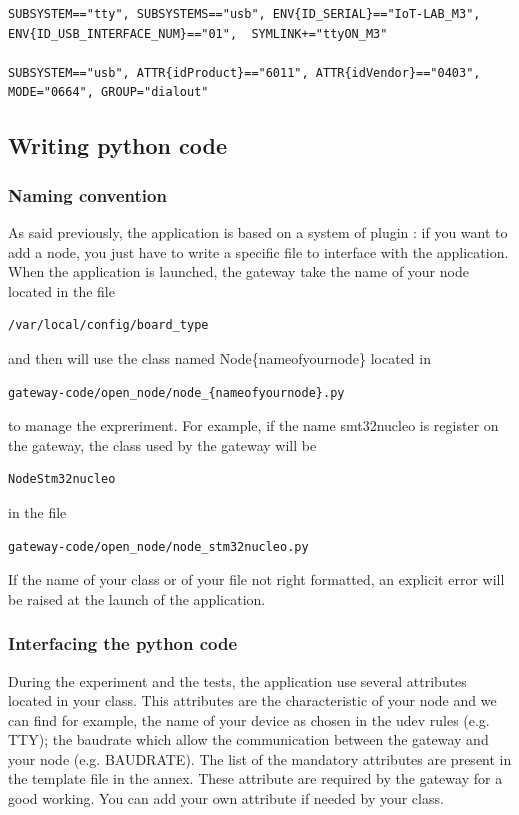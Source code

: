 \documentclass[12pt,a4paper,twoside]{article}
\begin{document}
\begin{verbatim}
SUBSYSTEM=="tty", SUBSYSTEMS=="usb", ENV{ID_SERIAL}=="IoT-LAB_M3", 
ENV{ID_USB_INTERFACE_NUM}=="01",  SYMLINK+="ttyON_M3"

SUBSYSTEM=="usb", ATTR{idProduct}=="6011", ATTR{idVendor}=="0403", 
MODE="0664", GROUP="dialout"
\end{verbatim}
\subsection{Writing python code}
\subsubsection{Naming convention}
As said previously, the application is based on a system of plugin : if you want to add a node, you just have to write a specific file to interface with the application.\newline
When the application is launched, the gateway take the name of your node located in the file \begin{verbatim}/var/local/config/board_type\end{verbatim} 
and then will use the class named Node\{nameofyournode\} located in \begin{verbatim}gateway-code/open_node/node_{nameofyournode}.py\end{verbatim}
to manage the expreriment. \newline
For example, if the name smt32nucleo is register on the gateway, the class used by the gateway will be 
\begin{verbatim}NodeStm32nucleo \end{verbatim}
in the file 
\begin{verbatim}gateway-code/open_node/node_stm32nucleo.py\end{verbatim}
If the name of your class or of your file not right formatted, an explicit error will be raised at the launch of the application.
\subsubsection{Interfacing the python code}
During the experiment and the tests, the application use several attributes located in your class. This attributes are the characteristic of your node and we can find for example, the name of your device as chosen in the udev rules (e.g. TTY); the baudrate which allow the communication between the gateway and your node (e.g. BAUDRATE).\newline
The list of the mandatory attributes are present in the template file in the annex. These attribute are required by the gateway for a good working.\newline
You can add your own attribute if needed by your class.\newline
\end{document}

